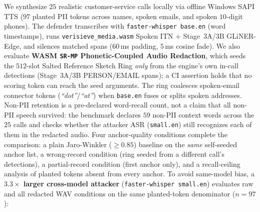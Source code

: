 \documentclass{article}
\begin{document}
We synthesize $25$ realistic customer-service calls locally via offline Windows SAPI TTS ($97$ planted PII tokens across names, spoken emails, and spoken $10$-digit phones). The defender transcribes with \texttt{faster-whisper base.en} \citep{radford2023whisper} (word timestamps), runs \texttt{verisieve\_media.wasm} Spoken ITN + Stage~3A/3B GLiNER-Edge, and silences matched spans ($60$\,ms padding, $5$\,ms cosine fade). We also evaluate \textbf{WASM \texttt{SR-MP} Phonetic-Coupled Audio Redaction}, which seeds the $512$-slot Salted Reference Sketch Ring \emph{only} from the engine's own in-call detections (Stage~3A/3B PERSON/EMAIL spans); a CI assertion holds that no scoring token can reach the seed arguments. The ring coalesces spoken-email connector tokens (\emph{``dot''}/\emph{``at''}) when \texttt{base.en} fuses or splits spoken addresses. Non-PII retention is a pre-declared word-recall count, not a claim that all non-PII speech survived: the benchmark declares $59$ non-PII context words across the $25$ calls and checks whether the attacker ASR (\texttt{small.en}) still recognizes each of them in the redacted audio. Four anchor-quality conditions complete the comparison: a plain Jaro-Winkler ($\ge 0.85$) baseline on the \emph{same} self-seeded anchor list, a wrong-record condition (ring seeded from a different call's detections), a partial-record condition (first anchor only), and a recall-ceiling analysis of planted tokens absent from every anchor. To avoid same-model bias, a \textbf{$3.3\times$ larger cross-model attacker} (\texttt{faster-whisper small.en}) evaluates raw and all redacted WAV conditions on the same planted-token denominator ($n{=}97$):
\end{document}
